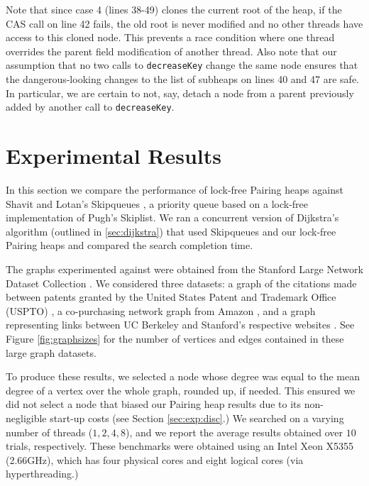 \documentclass{acm_proc_article-sp}
\begin{document}
Note that since case 4 (lines 38-49) clones the current root of the heap, if the CAS
call on line 42 fails, the old root is never modified and no other threads
have access to this cloned node. This prevents a race condition where one
thread overrides the parent field modification of another thread. Also
note that our assumption that no two calls to \texttt{decreaseKey} change
the same node ensures that the dangerous-looking changes to the
list of subheaps on lines 40 and 47 are safe. In particular, we are
certain to not, say, detach a node from a parent previously added by
another call to \texttt{decreaseKey}.



\section{Experimental Results}
\label{sec:exp}
In this section we compare the performance of lock-free Pairing heaps against
Shavit and Lotan's Skipqueues \cite{shavit00}, a priority queue based
on a lock-free implementation of Pugh's \cite{pugh90a} Skiplist.
We ran a concurrent version of Dijkstra's algorithm (outlined in 
\ref{sec:dijkstra}) that used Skipqueues and our lock-free Pairing heaps
and compared the search completion time.

The graphs experimented against were obtained from 
the Stanford Large Network Dataset Collection \cite{slndc}.
We considered three datasets: a graph of the citations made
between patents granted by the United States Patent and Trademark
Office (USPTO) \cite{leskovec05}, a co-purchasing network graph from Amazon \cite{leskovec07},
and a graph representing links between UC Berkeley and Stanford's respective websites \cite{leskovec09}.
See Figure \ref{fig:graphsizes} for the number of vertices and
edges contained in these large graph datasets.

To produce these results, we selected a node whose degree
was equal to the mean degree of a vertex over the whole graph,
rounded up, if needed. This ensured we did not select a node
that biased our Pairing heap results due to its non-negligible 
start-up costs (see Section \ref{sec:exp:disc}.) 
We searched on a varying number of threads ($1,2,4,8$), and
we report the average results obtained over $10$ trials, respectively. 
These benchmarks were obtained using an Intel Xeon X5355 (2.66GHz),
which has four physical cores and eight logical cores (via hyperthreading.)
\end{document}
